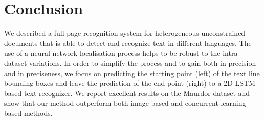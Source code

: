 \documentclass[conference]{IEEEtran}
\begin{document}
\section{Conclusion}
We described a full page recognition system for heterogeneous unconstrained documents that is able to detect and recognize text in different languages. The use of a neural network localisation process helps to be robust to the intra-dataset variations. In order to simplify the process and to gain both in precision and in preciseness, we focus on predicting the starting point (left) of the text line bounding boxes and leave the prediction of the end point (right)  to a 2D-LSTM based text recognizer. We report excellent results on the Maurdor dataset and show that our method outperform both image-based and concurrent learning-based methods.

\clearpage
\end{document}
